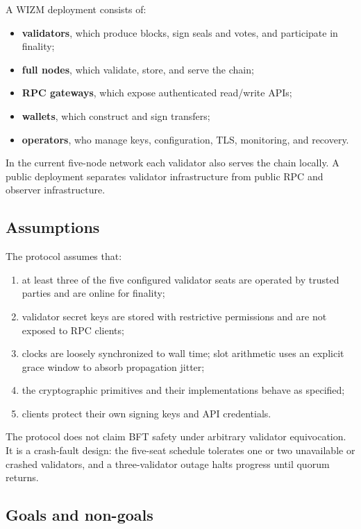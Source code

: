 \documentclass[11pt,a4paper]{article}
\begin{document}
A WIZM deployment consists of:

\begin{itemize}[leftmargin=*]
  \item \textbf{validators}, which produce blocks, sign seals and votes, and
        participate in finality;
  \item \textbf{full nodes}, which validate, store, and serve the chain;
  \item \textbf{RPC gateways}, which expose authenticated read/write APIs;
  \item \textbf{wallets}, which construct and sign transfers;
  \item \textbf{operators}, who manage keys, configuration, TLS, monitoring,
        and recovery.
\end{itemize}

In the current five-node network each validator also serves the chain locally.
A public deployment separates validator infrastructure from public RPC and
observer infrastructure.

\subsection{Assumptions}

The protocol assumes that:

\begin{enumerate}[leftmargin=*]
  \item at least three of the five configured validator seats are operated by
        trusted parties and are online for finality;
  \item validator secret keys are stored with restrictive permissions and are
        not exposed to RPC clients;
  \item clocks are loosely synchronized to wall time; slot arithmetic uses an
        explicit grace window to absorb propagation jitter;
  \item the cryptographic primitives and their implementations behave as
        specified;
  \item clients protect their own signing keys and API credentials.
\end{enumerate}

The protocol does not claim BFT safety under arbitrary validator
equivocation. It is a crash-fault design: the five-seat schedule tolerates
one or two unavailable or crashed validators, and a three-validator outage
halts progress until quorum returns.

\subsection{Goals and non-goals}
\end{document}
